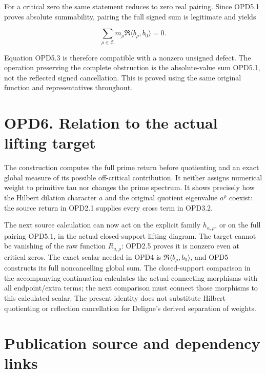 For a critical zero the same statement reduces to zero real pairing.
Since OPD5.1 proves absolute summability, pairing the full signed sum is
legitimate and yields

\[
\sum_{\rho\in\mathscr Z}m_\rho\Re\langle b_\rho,b_0\rangle=0.
\tag{OPD5.3}
\]

Equation OPD5.3 is therefore compatible with a nonzero unsigned defect.
The operation preserving the complete obstruction is the absolute-value
sum OPD5.1, not the reflected signed cancellation. This is proved using
the same original function and representatives throughout.

\section{OPD6. Relation to the actual lifting
target}\label{opd6.-relation-to-the-actual-lifting-target}

The construction computes the full prime return before quotienting and
an exact global measure of its possible off-critical contribution. It
neither assigns numerical weight to primitive tau nor changes the prime
spectrum. It shows precisely how the Hilbert dilation character \(a\)
and the original quotient eigenvalue \(a^\rho\) coexist: the source
return in OPD2.1 supplies every cross term in OPD3.2.

The next source calculation can now act on the explicit family
\(h_{a,\rho}\), or on the full pairing OPD5.1, in the actual
closed-support lifting diagram. The target cannot be vanishing of the
raw function \(R_{a,\rho}\): OPD2.5 proves it is nonzero even at
critical zeros. The exact scalar needed in OPD4 is
\(\Re\langle b_\rho,b_0\rangle\), and OPD5 constructs its full
noncancelling global sum. The closed-support comparison in the
accompanying continuation calculates the actual connecting morphisms
with all endpoint/extra terms; the next comparison must connect those
morphisms to this calculated scalar. The present identity does not
substitute Hilbert quotienting or reflection cancellation for Deligne's
derived separation of weights.

\section{Publication source and dependency
links}\label{publication-source-and-dependency-links-17}

